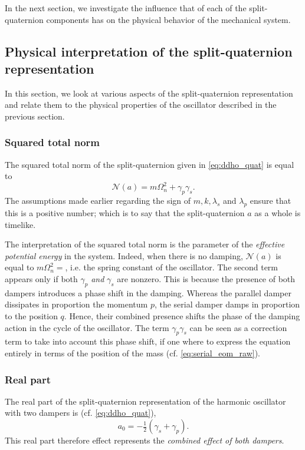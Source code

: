 In the next section, we investigate the influence that of each of the split-quaternion components has on the physical behavior of the mechanical system.

\subsection{Physical interpretation of the split-quaternion representation}
In this section, we look at various aspects of the split-quaternion representation and relate them to the physical properties of the oscillator described in the previous section. 

\subsubsection{Squared total norm}
The squared total norm of the split-quaternion given in \cref{eq:ddho_quat} is equal to 
\begin{equation}
     \mathscr{N}(a) = m \Omega_n^2 + \gamma_p \gamma_s.
\end{equation}
The assumptions made earlier regarding the sign of $m, k, \lambda_s$ and $\lambda_p$ ensure that this is a positive number; which is to say that the split-quaternion $a$ as a whole is timelike.

The interpretation of the squared total norm is the parameter of the \emph{effective potential energy} in the system. Indeed, when there is no damping, $\mathscr{N}(a)$ is equal to $m\Omega_n^2 = $, i.e. the spring constant of the oscillator. The second term appears only if both $\gamma_p$ \emph{and} $\gamma_s$ are nonzero. This is because the presence of both dampers introduces a phase shift in the damping. Whereas the parallel damper dissipates in proportion the momentum $p$, the serial damper damps in proportion to the position $q$. Hence, their combined presence shifts the phase of the damping action in the cycle of the oscillator. The term $\gamma_p \gamma_s$ can be seen as a correction term to take into account this phase shift, if one where to express the equation entirely in terms of the position of the mass (cf. \cref{eq:serial_eom_raw}).

\subsubsection{Real part} 
The real part of the split-quaternion representation of the harmonic oscillator with two dampers is (cf. \cref{eq:ddho_quat}),
\begin{equation}
     a_0 = -\tfrac{1}{2}(\gamma_s + \gamma_p).
\end{equation}
This real part therefore effect represents the \emph{combined effect of both dampers}.

